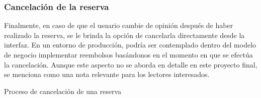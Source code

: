 
\subsubsection{Cancelación de la reserva}

Finalmente, en caso de que el usuario cambie de opinión después de haber realizado la reserva, se le brinda la opción de cancelarla directamente desde la interfaz. En un entorno de producción, podría ser contemplado dentro del modelo de negocio implementar reembolsos basándonos en el momento en que se efectúa la cancelación. Aunque este aspecto no se aborda en detalle en este proyecto final, se menciona como una nota relevante para los lectores interesados.

\begin{images}[\label{cancelacion_reserva}]{Proceso de cancelación de una reserva}
\end{images}
